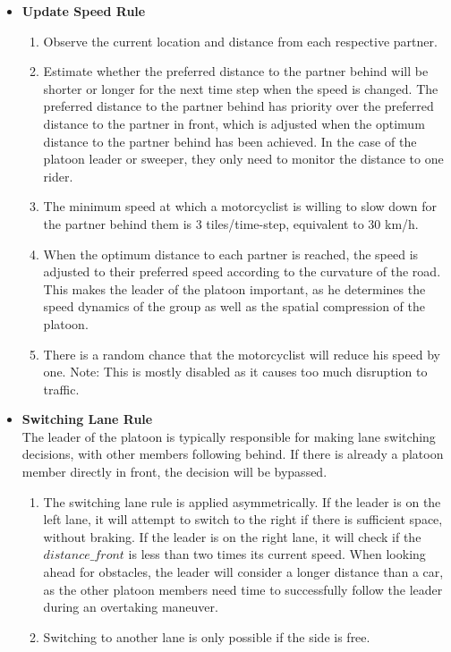 \begin{itemize}
\begin{itemize}
        \item \textbf{Update Speed Rule}
         \begin{enumerate}
             \item Observe the current location and distance from each respective partner.
             \item Estimate whether the preferred distance to the partner behind will be shorter or longer for the next time step when the speed is changed. The preferred distance to the partner behind has priority over the preferred distance to the partner in front, which is adjusted when the optimum distance to the partner behind has been achieved. In the case of the platoon leader or sweeper, they only need to monitor the distance to one rider.
             \item The minimum speed at which a motorcyclist is willing to slow down for the partner behind them is 3 tiles/time-step, equivalent to 30 km/h.
             \item When the optimum distance to each partner is reached, the speed is adjusted to their preferred speed according to the curvature of the road. This makes the leader of the platoon important, as he determines the speed dynamics of the group as well as the spatial compression of the platoon. 
             \item There is a random chance that the motorcyclist will reduce his speed by one. Note: This is mostly disabled as it causes too much disruption to traffic. 
         \end{enumerate}
         \item \textbf{Switching Lane Rule}\\
         The leader of the platoon is typically responsible for making lane switching decisions, with other members following behind. If there is already a platoon member directly in front, the decision will be bypassed.
         \begin{enumerate}
         \item The switching lane rule is applied asymmetrically. If the leader is on the left lane, it will attempt to switch to the right if there is sufficient space, without braking. If the leader is on the right lane, it will check if the $distance\_front$ is less than two times its current speed. When looking ahead for obstacles, the leader will consider a longer distance than a car, as the other platoon members need time to successfully follow the leader during an overtaking maneuver.
         \item Switching to another lane is only possible if the side is free. 

\end{enumerate}
\end{itemize}
\end{itemize}
